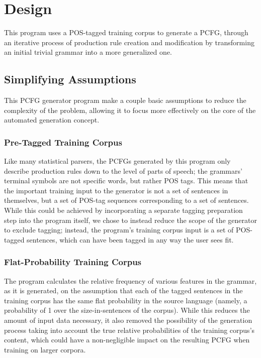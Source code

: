 \documentclass[paper=a4, fontsize=11pt]{scrartcl} %
\numberwithin{equation}{section} %
\numberwithin{figure}{section} %
\numberwithin{table}{section} %
\begin{document}

\section{Design}

This program uses a POS-tagged training corpus to generate a PCFG, through an iterative process of production rule creation and modification by transforming an initial trivial grammar into a more generalized one.

\subsection{Simplifying Assumptions}

This PCFG generator program make a couple basic assumptions to reduce the complexity of the problem, allowing it to focus more effectively on the core of the automated generation concept.

\subsubsection{Pre-Tagged Training Corpus}

Like many statistical parsers, the PCFGs generated by this program only describe production rules down to the level of parts of speech; the grammars' terminal symbols are not specific words, but rather POS tags. This means that the important training input to the generator is not a set of sentences in themselves, but a set of POS-tag sequences corresponding to a set of sentences. While this could be achieved by incorporating a separate tagging preparation step into the program itself, we chose to instead reduce the scope of the generator to exclude tagging; instead, the program's training corpus input is a set of POS-tagged sentences, which can have been tagged in any way the user sees fit.

\subsubsection{Flat-Probability Training Corpus}

The program calculates the relative frequency of various features in the grammar, as it is generated, on the assumption that each of the tagged sentences in the training corpus has the same flat probability in the source language (namely, a probability of 1 over the size-in-sentences of the corpus). While this reduces the amount of input data necessary, it also removed the possibility of the generation process taking into account the true relative probabilities of the training corpus's content, which could have a non-negligible impact on the resulting PCFG when training on larger corpora.
\end{document}
